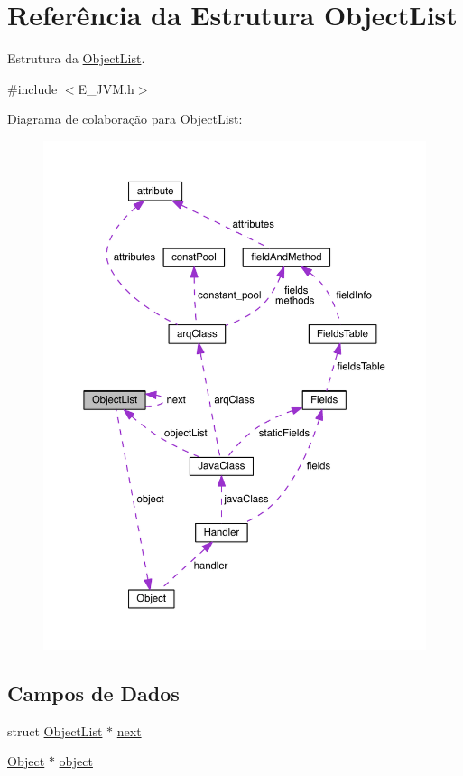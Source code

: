 \hypertarget{struct_object_list}{}\section{Referência da Estrutura Object\+List}
\label{struct_object_list}


Estrutura da \hyperlink{struct_object_list}{Object\+List}.  




{\ttfamily \#include $<$E\+\_\+\+J\+V\+M.\+h$>$}



Diagrama de colaboração para Object\+List\+:\nopagebreak
\begin{figure}[H]
\begin{center}
\leavevmode
\includegraphics[width=350pt]{struct_object_list__coll__graph}
\end{center}
\end{figure}
\subsection*{Campos de Dados}
\begin{DoxyCompactItemize}
\item 
struct \hyperlink{struct_object_list}{Object\+List} $\ast$ \hyperlink{struct_object_list_a2e433d18d52a5cd2b3f90651157fdb23}{next}
\item 
\hyperlink{struct_object}{Object} $\ast$ \hyperlink{struct_object_list_aae49442726f57917e2d6611c62f1e071}{object}
\end{DoxyCompactItemize}


